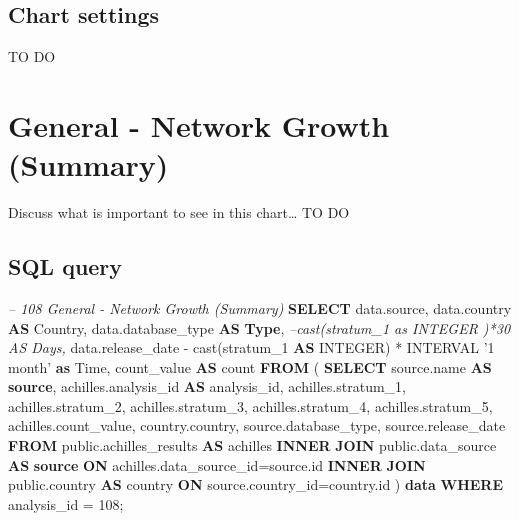 \documentclass[]{book}
\newenvironment{Shaded}{\begin{snugshade}}{\end{snugshade}}
\newcommand{\KeywordTok}[1]{\textcolor[rgb]{0.13,0.29,0.53}{\textbf{#1}}}
\newcommand{\DataTypeTok}[1]{\textcolor[rgb]{0.13,0.29,0.53}{#1}}
\newcommand{\DecValTok}[1]{\textcolor[rgb]{0.00,0.00,0.81}{#1}}
\newcommand{\StringTok}[1]{\textcolor[rgb]{0.31,0.60,0.02}{#1}}
\newcommand{\CommentTok}[1]{\textcolor[rgb]{0.56,0.35,0.01}{\textit{#1}}}
\newcommand{\FunctionTok}[1]{\textcolor[rgb]{0.00,0.00,0.00}{#1}}
\newcommand{\NormalTok}[1]{#1}
\begin{document}
\subsection{Chart settings}\label{chart-settings-2}

TO DO

\section{General - Network Growth
(Summary)}\label{general---network-growth-summary}

Discuss what is important to see in this chart\ldots{} TO DO

\subsection{SQL query}\label{sql-query-3}

\begin{Shaded}
\begin{Highlighting}[]
\CommentTok{-- 108    General - Network Growth (Summary)}
\KeywordTok{SELECT}\NormalTok{ data.source,}
\NormalTok{       data.country }\KeywordTok{AS}\NormalTok{ Country,}
\NormalTok{       data.database_type }\KeywordTok{AS} \KeywordTok{Type}\NormalTok{,}
       \CommentTok{--cast(stratum_1 as INTEGER )*30 AS Days,}
\NormalTok{       data.release_date - }\FunctionTok{cast}\NormalTok{(stratum_1 }\KeywordTok{AS} \DataTypeTok{INTEGER}\NormalTok{) * }\DataTypeTok{INTERVAL} 
        \StringTok{'1 month'} \KeywordTok{as} \DataTypeTok{Time}\NormalTok{,}
\NormalTok{       count_value                   }\KeywordTok{AS} \FunctionTok{count}
\KeywordTok{FROM}\NormalTok{ (}
     \KeywordTok{SELECT}\NormalTok{ source.name              }\KeywordTok{AS} \KeywordTok{source}\NormalTok{,}
\NormalTok{            achilles.analysis_id     }\KeywordTok{AS}\NormalTok{ analysis_id,}
\NormalTok{            achilles.stratum_1,}
\NormalTok{            achilles.stratum_2,}
\NormalTok{            achilles.stratum_3,}
\NormalTok{            achilles.stratum_4,}
\NormalTok{            achilles.stratum_5,}
\NormalTok{            achilles.count_value,}
\NormalTok{            country.country,}
\NormalTok{            source.database_type, }
\NormalTok{            source.release_date}
     \KeywordTok{FROM}\NormalTok{ public.achilles_results }\KeywordTok{AS}\NormalTok{ achilles }\KeywordTok{INNER} \KeywordTok{JOIN} 
\NormalTok{        public.data_source }\KeywordTok{AS} \KeywordTok{source} \KeywordTok{ON}
\NormalTok{        achilles.data_source_id=source.id}
     \KeywordTok{INNER} \KeywordTok{JOIN}\NormalTok{ public.country }\KeywordTok{AS}\NormalTok{ country }\KeywordTok{ON} 
\NormalTok{        source.country_id=country.id}
\NormalTok{     ) }\KeywordTok{data}
\KeywordTok{WHERE}\NormalTok{ analysis_id = }\DecValTok{108}\NormalTok{;}
\end{Highlighting}
\end{Shaded}
\end{document}
